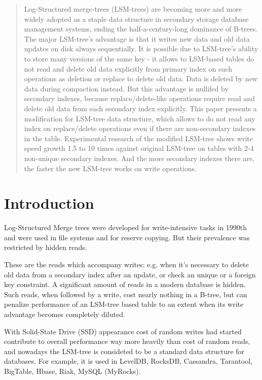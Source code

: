 \documentclass{vldb}
\begin{document}
\maketitle

\begin{abstract}
Log-Structured merge-trees (LSM-trees) are becoming more and more widely
adopted as a staple data structure in secondary storage database management
systems, ending the half-a-century-long dominance of B-trees. The major
LSM-tree's advantage is that it writes new data and old data updates on disk
always sequentially. It is possible due to LSM-tree's ability to store many
versions of the same key - it allows to LSM-based tables do not read and delete
old data explicitly from primary index on such operations as deletion or replace
to delete old data. Data is deleted by new data during compaction instead. But
this advantage is nullifed by secondary indexes, because replace/delete-like
operations require read and delete old data from each secondary index explicitly.
This paper presents a modification for LSM-tree data structure, which allows to
do not read any index on replace/delete operations even if there are
non-secondary indexes in the table.
Experimental research of the modified LSM-tree shows write speed growth 1.5 to
10 times against original LSM-tree on tables with 2-4 non-unique secondary
indexes. And the more secondary indexes there are, the faster the new LSM-tree
works on write operations.
\end{abstract}

\section{Introduction}
Log-Structured Merge trees were developed for write-intensive tasks in 1990th
and were used in file systems and for reserve copying. But their prevalence was
restricted by hidden reads.

These are the reads which accompany writes: e.g. when it’s necessary to delete
old data from a secondary index after an update, or check an unique or a foreign
key constraint. A significant amount of reads in a modern database is hidden.
Such reads, when followed by a write, cost nearly nothing in a B-tree, but can
penalize performance of an LSM-tree based table to an extent when its write
advantage becomes completely diluted.

With Solid-State Drive (SSD) appearance cost of random writes had started
contribute to overall performance way more heavily than cost of random reads,
and nowadays the LSM-tree is consideted to be a standard data structure for
databases. For example, it is used in LevelDB, RocksDB, Cassandra, Tarantool,
BigTable, Hbase, Riak, MySQL (MyRocks).
\end{document}
